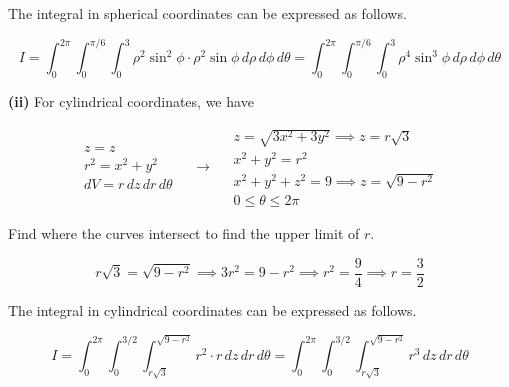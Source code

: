 \documentclass{article}
\begin{document}
The integral in spherical coordinates can be expressed as follows.

\[\boxed{{I}=\int_0^{2\pi}\int_0^{\pi/6}\int_{0}^3\rho^2\sin^2\phi\cdot\rho^2\sin\phi\,d\rho\,d\phi\,d\theta=\int_0^{2\pi}\int_0^{\pi/6}\int_{0}^3\rho^4\sin^3\phi\,d\rho\,d\phi\,d\theta}\]

\textbf{(ii)} For cylindrical coordinates, we have

\[
\begin{array}{c}
z=z\\
r^2=x^2+y^2\\
dV=r\,dz\,dr\,d\theta
\end{array}\quad\rightarrow\quad
\begin{array}{c}
z=\sqrt{3x^2+3y^2}\implies z=r\sqrt3\\[0.1cm]
x^2+y^2=r^2\\[0.1cm]
x^2+y^2+z^2=9\implies z=\sqrt{9-r^2}\\[0.1cm]
0\leq\theta\leq2\pi
\end{array}
\]

Find where the curves intersect to find the upper limit of $r$.

\[r\sqrt3=\sqrt{9-r^2}\implies3r^2=9-r^2\implies r^2=\frac94\implies r=\frac32\]

The integral in cylindrical coordinates can be expressed as follows.

\[\boxed{{I}=\int_0^{2\pi}\int_0^{3/2}\int_{r\sqrt3}^{\sqrt{9-r^2}}r^2\cdot r\,dz\,dr\,d\theta=\int_0^{2\pi}\int_0^{3/2}\int_{r\sqrt3}^{\sqrt{9-r^2}}r^3\,dz\,dr\,d\theta}\]
\end{document}
